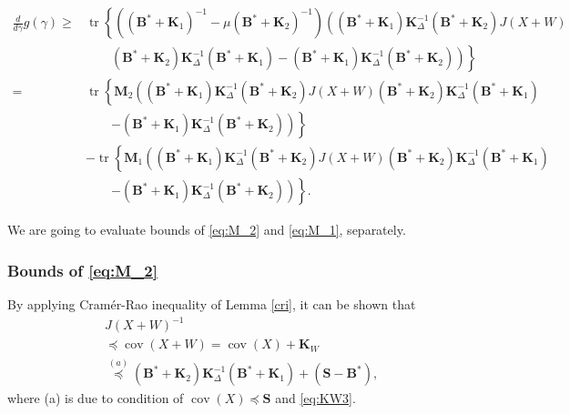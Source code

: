 \documentclass[journal,final, onecolumn]{IEEEtran}
\DeclareMathOperator{\tr}{tr}
\DeclareMathOperator{\cov}{cov}
\begin{document}
\begin{align}
\frac{d}{d\gamma}g(\gamma)\geq & \tr \left\{  \left(      (\boldsymbol{B}^{*} + \boldsymbol{K}_{1})^{-1} - \mu (\boldsymbol{B}^{*} + \boldsymbol{K}_{2})^{-1}  \right) \left(      (\boldsymbol{B}^{*} + \boldsymbol{K}_{1}) \boldsymbol{K}^{-1}_{\Delta}(\boldsymbol{B}^{*} + \boldsymbol{K}_{2}) J(X+W) \right.\right.\nonumber \\
& \qquad \left.\left.(\boldsymbol{B}^{*} + \boldsymbol{K}_{2}) \boldsymbol{K}^{-1}_{\Delta}(\boldsymbol{B}^{*} + \boldsymbol{K}_{1})  -(\boldsymbol{B}^{*} + \boldsymbol{K}_{1}) \boldsymbol{K}^{-1}_{\Delta}(\boldsymbol{B}^{*} + \boldsymbol{K}_{2})     \right)         \right\}\\
= & \tr \left\{  \boldsymbol{M}_{2} \left(      (\boldsymbol{B}^{*} + \boldsymbol{K}_{1}) \boldsymbol{K}^{-1}_{\Delta}(\boldsymbol{B}^{*} + \boldsymbol{K}_{2}) J(X+W)(\boldsymbol{B}^{*} + \boldsymbol{K}_{2}) \boldsymbol{K}^{-1}_{\Delta}(\boldsymbol{B}^{*} + \boldsymbol{K}_{1}) \right.\right.\nonumber \\
& \qquad \left.\left.  -(\boldsymbol{B}^{*} + \boldsymbol{K}_{1}) \boldsymbol{K}^{-1}_{\Delta}(\boldsymbol{B}^{*} + \boldsymbol{K}_{2})     \right)         \right\} \label{eq:M_2}\\
& - \tr \left\{  \boldsymbol{M}_{1}\left(      (\boldsymbol{B}^{*} + \boldsymbol{K}_{1}) \boldsymbol{K}^{-1}_{\Delta}(\boldsymbol{B}^{*} + \boldsymbol{K}_{2}) J(X+W) (\boldsymbol{B}^{*} + \boldsymbol{K}_{2}) \boldsymbol{K}^{-1}_{\Delta}(\boldsymbol{B}^{*} + \boldsymbol{K}_{1})\right.\right.\nonumber \\
& \qquad \left.\left.  -(\boldsymbol{B}^{*} + \boldsymbol{K}_{1}) \boldsymbol{K}^{-1}_{\Delta}(\boldsymbol{B}^{*} + \boldsymbol{K}_{2})     \right)         \right\}. \label{eq:M_1}
\end{align}

We are going to evaluate bounds of \eqref{eq:M_2} and \eqref{eq:M_1}, separately.








\subsubsection{Bounds of \eqref{eq:M_2}}
By applying Cram\'{e}r-Rao inequality of Lemma \ref{cri}, it can be shown that
\begin{align}
&J(X+W)^{-1} \nonumber \\
&\preceq \cov(X+W)=\cov(X)+ \boldsymbol{K}_{W} \\
& \overset{(a)}\preceq (\boldsymbol{B}^{*} + \boldsymbol{K}_{2}) \boldsymbol{K}^{-1}_{\Delta}(\boldsymbol{B}^{*} + \boldsymbol{K}_{1}) +\left(\boldsymbol{S}- \boldsymbol{B}^{*}\right),
\end{align}
where (a) is due to condition of $\cov(X) \preceq \boldsymbol{S}$ and \eqref{eq:KW3}.
\end{document}
